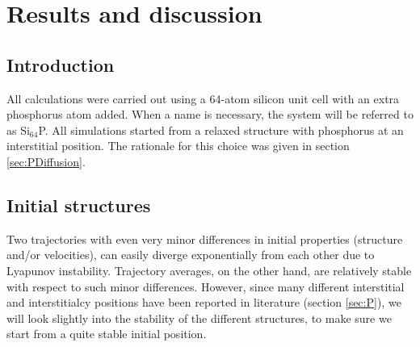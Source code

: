 \documentclass[11pt,bibliography=totoc,index=totoc]{scrbook}   %
\begin{document}



%
\chapter{Results and discussion}\label{cha:results} %
%

%
\section{Introduction}\label{sec:resultsIntro}
%

All calculations were carried out using a 64-atom silicon unit cell with an extra phosphorus atom added. 
When a name is necessary, the system will be referred to as Si$_{64}$P.
All simulations started from a relaxed structure with phosphorus at an interstitial position. 
The rationale for this choice was given in section \ref{sec:PDiffusion}.

%
\section{Initial structures}\label{sec:structures}
%

Two trajectories with even very minor differences in initial properties (structure and/or velocities),
can easily diverge exponentially from each other due to Lyapunov instability.\cite[72]{Frenkel:1996}
Trajectory averages, on the other hand, are relatively stable with respect to such minor differences.
However, since many different interstitial and interstitialcy positions have been reported in literature 
(section \ref{sec:P}), we will look slightly into the stability of the different structures, to make
sure we start from a quite stable initial position.
\end{document}
